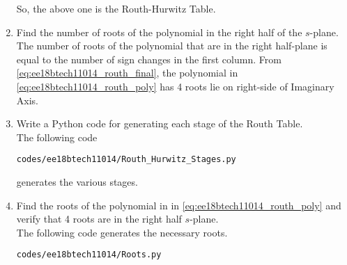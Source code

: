 \begin{enumerate}[label=\thesubsection.\arabic*.,ref=\thesubsection.\theenumi]
So, the above one is the Routh-Hurwitz Table.

\item Find the number of roots of the polynomial in the right half of the $s$-plane.
\\
\solution The number of roots of the polynomial that are in the right half-plane is equal to
the number of sign changes in the first column. From \ref{eq:ee18btech11014_routh_final},
the polynomial in \eqref{eq:ee18btech11014_routh_poly}
has 4 roots lie on right-side of Imaginary Axis.

\item Write a Python code for generating each stage of the Routh Table.
\\
\solution The following code 
\begin{lstlisting}
codes/ee18btech11014/Routh_Hurwitz_Stages.py
\end{lstlisting}
%
generates the various stages.
%

\item Find the roots of the polynomial in in \eqref{eq:ee18btech11014_routh_poly} and verify that 4 roots are in the right half $s$-plane.
\\
\solution The following code generates the necessary roots.
\begin{lstlisting}
codes/ee18btech11014/Roots.py
\end{lstlisting}
\end{enumerate}

